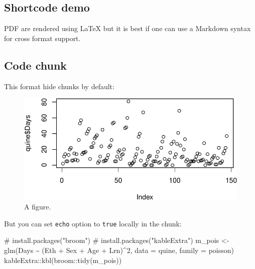 \documentclass[
]{article}
\newenvironment{Shaded}{\begin{snugshade}}{\end{snugshade}}
\newcommand{\AttributeTok}[1]{\textcolor[rgb]{0.40,0.45,0.13}{#1}}
\newcommand{\CommentTok}[1]{\textcolor[rgb]{0.37,0.37,0.37}{#1}}
\newcommand{\DecValTok}[1]{\textcolor[rgb]{0.68,0.00,0.00}{#1}}
\newcommand{\FunctionTok}[1]{\textcolor[rgb]{0.28,0.35,0.67}{#1}}
\newcommand{\NormalTok}[1]{\textcolor[rgb]{0.00,0.23,0.31}{#1}}
\newcommand{\OtherTok}[1]{\textcolor[rgb]{0.00,0.23,0.31}{#1}}
\newcommand{\SpecialCharTok}[1]{\textcolor[rgb]{0.37,0.37,0.37}{#1}}
\begin{document}
\hypertarget{sec-shortcode}{%
\subsection{Shortcode demo}\label{sec-shortcode}}

PDF are rendered using {\LaTeX} but it is best if one can use a Markdown
syntax for cross format support.

\hypertarget{sec-chunks}{%
\subsection{Code chunk}\label{sec-chunks}}

This format hide chunks by default:

\begin{figure}

{\centering \includegraphics{template_files/figure-pdf/unnamed-chunk-1-1.pdf}

}

\caption{A figure.}

\end{figure}

But you can set \texttt{echo} option to \texttt{true} locally in the
chunk:

\begin{Shaded}
\begin{Highlighting}[]
\CommentTok{\# install.packages("broom")}
\CommentTok{\# install.packages("kableExtra")}
\NormalTok{m\_pois }\OtherTok{\textless{}{-}} \FunctionTok{glm}\NormalTok{(Days }\SpecialCharTok{\textasciitilde{}}\NormalTok{ (Eth }\SpecialCharTok{+}\NormalTok{ Sex }\SpecialCharTok{+}\NormalTok{ Age }\SpecialCharTok{+}\NormalTok{ Lrn)}\SpecialCharTok{\^{}}\DecValTok{2}\NormalTok{, }\AttributeTok{data =}\NormalTok{ quine, }\AttributeTok{family =}\NormalTok{ poisson)}
\NormalTok{kableExtra}\SpecialCharTok{::}\FunctionTok{kbl}\NormalTok{(broom}\SpecialCharTok{::}\FunctionTok{tidy}\NormalTok{(m\_pois))}
\end{Highlighting}
\end{Shaded}
\end{document}
